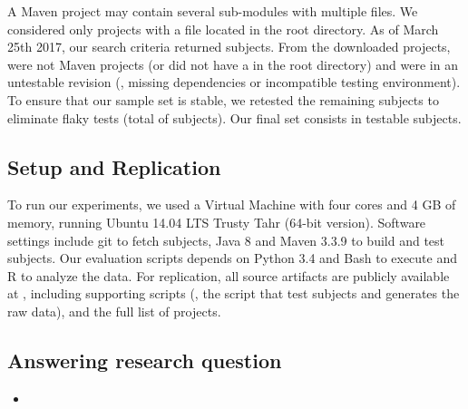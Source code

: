 A Maven project may contain several sub-modules with multiple \pomf{}
files. We considered only projects with a \pomf{} file located in the
root directory.  As of March 25th 2017, our search criteria returned
\SubjectsGithub{} subjects.  From the \SubjectsGithub{} downloaded
projects, \SubjectsGithubNotMaven{} were not Maven projects (or did
not have a \pomf{} in the root directory) and
\SubjectsGithubNotTestable{} were in an untestable revision (\eg,
missing dependencies or incompatible testing environment). To ensure
that our sample set is stable, we retested the remaining subjects to
eliminate flaky tests (total of \SubjectsGithubFlaky{} subjects). Our
final set consists in \numSubjs{} testable subjects.

\subsection{Setup and Replication}
\label{sec:setup}


To run our experiments, we used a Virtual Machine with four cores and
4 GB of memory, running Ubuntu 14.04 LTS Trusty Tahr (64-bit version).
Software settings include git to fetch subjects, Java 8 and Maven
3.3.9 to build and test subjects. Our evaluation scripts depends on
Python 3.4 and Bash to execute and R to analyze the data.
For replication, all source artifacts are publicly available at
, including supporting scripts (\eg, the script
that test subjects and generates the raw data), and the full list of
projects. 

\subsection{Answering research question \numRQA{}}
\label{sec:rqA}

\begin{itemize}
    \item \emph{\RQA}
\end{itemize}

